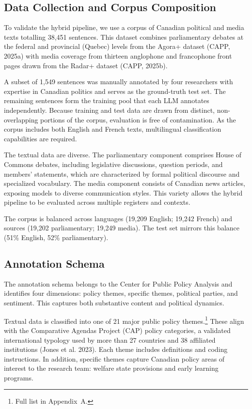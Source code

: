 \documentclass[12pt]{article}
\begin{document}
\subsection{Data Collection and Corpus Composition}

To validate the hybrid pipeline, we use a corpus of Canadian political and media texts totalling 38,451 sentences. This dataset combines parliamentary debates at the federal and provincial (Quebec) levels from the Agora+ dataset (CAPP, 2025a) with media coverage from thirteen anglophone and francophone front pages drawn from the Radar+ dataset (CAPP, 2025b).

A subset of 1,549 sentences was manually annotated by four researchers with expertise in Canadian politics and serves as the ground-truth test set. The remaining sentences form the training pool that each LLM annotates independently. Because training and test data are drawn from distinct, non-overlapping portions of the corpus, evaluation is free of contamination. As the corpus includes both English and French texts, multilingual classification capabilities are required.

The textual data are diverse. The parliamentary component comprises House of Commons debates, including legislative discussions, question periods, and members’ statements, which are characterized by formal political discourse and specialized vocabulary. The media component consists of Canadian news articles, exposing models to diverse communication styles. This variety allows the hybrid pipeline to be evaluated across multiple registers and contexts.



The corpus is balanced across languages (19,209 English; 19,242 French) and sources (19,202 parliamentary; 19,249 media). The test set mirrors this balance (51\% English, 52\% parliamentary).

\subsection{Annotation Schema}

The annotation schema belongs to the Center for Public Policy Analysis and identifies four dimensions: policy themes, specific themes, political parties, and sentiment. This captures both substantive content and political dynamics.

Textual data is classified into one of 21 major public policy themes.\footnote{Full list in Appendix~A.} These align with the Comparative Agendas Project (CAP) policy categories, a validated international typology used by more than 27 countries and 38 affiliated institutions (Jones et al. 2023). Each theme includes definitions and coding instructions. In addition, specific themes capture Canadian policy areas of interest to the research team: welfare state provisions and early learning programs.
\end{document}
